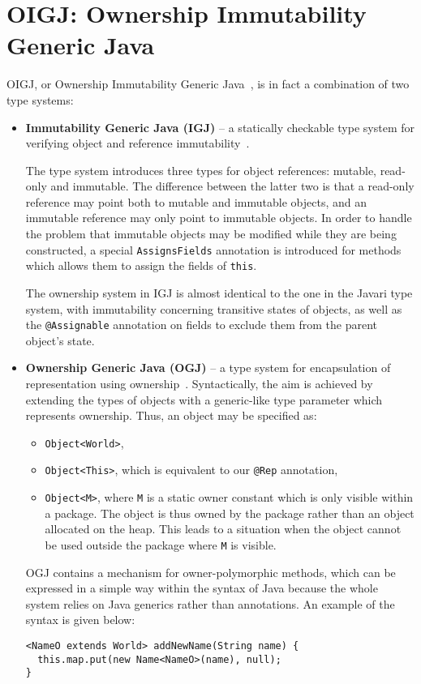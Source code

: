 \documentclass{pracamgr}
\theoremstyle{break}
\theoremstyle{break}
\theoremstyle{break}
\begin{document}
\section{OIGJ: Ownership Immutability Generic Java}

OIGJ, or Ownership Immutability Generic Java~\cite{oigj}, is in fact a
combination of two type systems:
\begin{itemize}
\item \textbf{Immutability Generic Java (IGJ)} -- a statically
  checkable type system for verifying object and reference
  immutability~\cite{igj, enforcing-igj}.
  
  The type system introduces three types for object references:
  mutable, read-only and immutable. The difference between the latter
  two is that a read-only reference may point both to mutable and
  immutable objects, and an immutable reference may only point to
  immutable objects. In order to handle the problem that immutable
  objects may be modified while they are being constructed, a special
  \texttt{AssignsFields} annotation is introduced for methods which
  allows them to assign the fields of \texttt{this}.

  The ownership system in IGJ is almost identical to the one in the
  Javari type system, with immutability concerning transitive states
  of objects, as well as the \texttt{@Assignable} annotation on fields
  to exclude them from the parent object's state. 
\item \textbf{Ownership Generic Java (OGJ)} -- a type system for
  encapsulation of representation using
  ownership~\cite{ogj}. Syntactically, the aim is achieved by
  extending the types of objects with a generic-like type parameter
  which represents ownership. Thus, an object may be specified as:
  \begin{itemize}
  \item \texttt{Object<World>},
  \item \texttt{Object<This>}, which is equivalent to our
    \texttt{@Rep} annotation, 
  \item \texttt{Object<M>}, where \texttt{M} is a static owner
    constant which is only visible within a package. The object is
    thus owned by the package rather than an object allocated on the
    heap. This leads to a situation when the object cannot be used
    outside the package where \texttt{M} is visible.
  \end{itemize}

  OGJ contains a mechanism for owner-polymorphic methods, which can be
  expressed in a simple way within the syntax of Java because the
  whole system relies on Java generics rather than annotations. An
  example of the syntax is given below:
  \begin{lstlisting}
<NameO extends World> addNewName(String name) {
  this.map.put(new Name<NameO>(name), null);
}
  \end{lstlisting}
\end{itemize}
\end{document}
